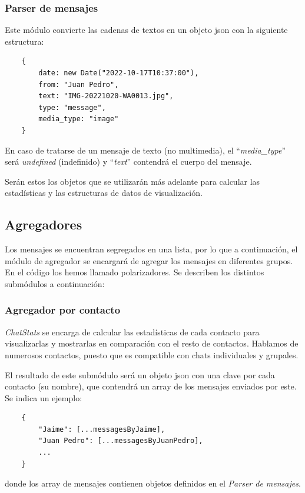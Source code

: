 \subsubsection{Parser de mensajes}

Este módulo convierte las cadenas de textos en un objeto \acrshort{json} con la siguiente estructura:

\begin{lstlisting}
	{
		date: new Date("2022-10-17T10:37:00"),
		from: "Juan Pedro",
		text: "IMG-20221020-WA0013.jpg",
		type: "message",
		media_type: "image"
	}
\end{lstlisting}

En caso de tratarse de un mensaje de texto (no multimedia), el ``\textit{media\_type}'' será \textit{undefined} (indefinido) y ``\textit{text}'' contendrá el cuerpo del mensaje.

Serán estos los objetos que se utilizarán más adelante para calcular las estadísticas y las estructuras de datos de visualización.

\subsection{Agregadores}

Los mensajes se encuentran segregados en una lista, por lo que a continuación, el módulo de agregador se encargará de agregar los mensajes en diferentes grupos. En el código los hemos llamado polarizadores. Se describen los distintos submódulos a continuación:

\subsubsection{Agregador por contacto}

\textit{ChatStats} se encarga de calcular las estadísticas de cada contacto para visualizarlas y mostrarlas en comparación con el resto de contactos. Hablamos de numerosos contactos, puesto que es compatible con chats individuales y grupales.

El resultado de este submódulo será un objeto \acrshort{json} con una clave por cada contacto (su nombre), que contendrá un array de los mensajes enviados por este. Se indica un ejemplo:

\begin{lstlisting}
	{
		"Jaime": [...messagesByJaime],
		"Juan Pedro": [...messagesByJuanPedro],
		...
	}
\end{lstlisting}

donde los array de mensajes contienen objetos definidos en el \textit{Parser de mensajes}.


